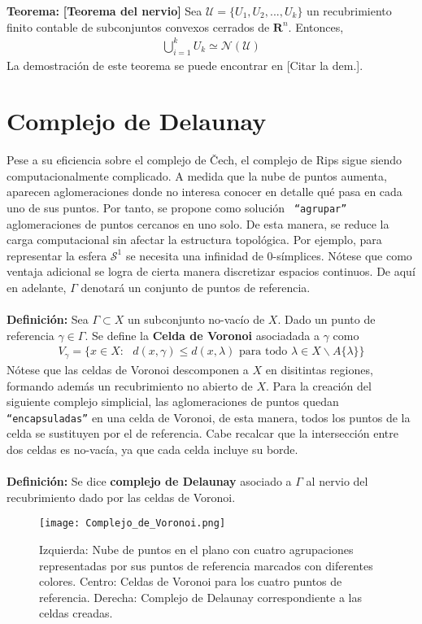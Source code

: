 \documentclass{article}
\begin{document}
\textbf{Teorema:} \textbf{[Teorema del nervio]} Sea $\mathcal{U}=\{U_{1}, U_{2}, ... ,U_{k}\}$ un recubrimiento finito contable de subconjuntos convexos cerrados de $\mathbf{R}^n$. Entonces, 
\begin{align*}
    \bigcup_{i=1}^{k}U_{k} \simeq \mathcal{N}(\mathcal{U})
\end{align*}
La demostración de este teorema se puede encontrar en [Citar la dem.]. 



\section{Complejo de Delaunay}
Pese a su eficiencia sobre el complejo de Čech, el complejo de Rips sigue siendo computacionalmente complicado. A medida que la nube de puntos aumenta, aparecen aglomeraciones donde no interesa conocer en detalle qué pasa en cada uno de sus puntos. Por tanto, se propone como solución \texttt{
``agrupar''} aglomeraciones de puntos cercanos en uno solo. De esta manera, se reduce la carga computacional sin afectar la estructura topológica. Por ejemplo, para representar la esfera $\mathcal{S}^1$ se necesita una infinidad de 0-símplices. Nótese que como ventaja adicional se logra de cierta manera discretizar espacios continuos. De aquí en adelante, $\Gamma$ denotará un conjunto de puntos de referencia.\\
\\
\textbf{Definición:} Sea $\Gamma \subset X$ un subconjunto no-vacío de $X$. Dado un punto de referencia $\gamma \in \Gamma$. Se define la \textbf{Celda de Voronoi} asociadada a $\gamma$ como
\begin{align*}
    V_{\gamma}=\{x \in X: \text{ } d(x,\gamma) \leq d(x,\lambda) \text{ para todo } \lambda \in X\backslash A \{ \lambda\}\}
\end{align*}
Nótese que las celdas de Voronoi descomponen a $X$ en disitintas regiones, formando además un recubrimiento no abierto de $X$. Para la creación del siguiente complejo simplicial, las aglomeraciones de puntos quedan \texttt{``encapsuladas''} en una celda de Voronoi, de esta manera, todos los puntos de la celda se sustituyen por el de referencia. Cabe recalcar que la intersección entre dos celdas es no-vacía, ya que cada celda incluye su borde.\\
\\
\textbf{Definición:} Se dice \textbf{complejo de Delaunay} asociado a $\Gamma$ al nervio del recubrimiento dado por las celdas de Voronoi.%
\begin{figure}[h]
  \centering
  \texttt{[image: Complejo\_de\_Voronoi.png]}
  \caption{Izquierda: Nube de puntos en el plano con cuatro agrupaciones representadas por sus puntos de referencia marcados con diferentes colores. Centro: Celdas de Voronoi para los cuatro puntos de referencia. Derecha: Complejo de Delaunay correspondiente a las celdas creadas.}
  \label{fig:mi_imagen}
\end{figure}
\end{document}
